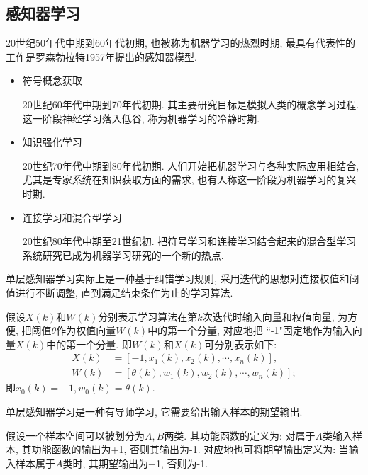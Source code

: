 \subsection{感知器学习}
 20世纪50年代中期到60年代初期, 也被称为机器学习的热烈时期, 最具有代表性的工作是罗森勃拉特1957年提出的感知器模型.
\begin{itemize}
\item 符号概念获取

    20世纪60年代中期到70年代初期. 其主要研究目标是模拟人类的概念学习过程. 这一阶段神经学习落入低谷, 称为机器学习的冷静时期.
\item 知识强化学习

    20世纪70年代中期到80年代初期. 人们开始把机器学习与各种实际应用相结合, 尤其是专家系统在知识获取方面的需求, 也有人称这一阶段为机器学习的复兴时期.
\item 连接学习和混合型学习

    20世纪80年代中期至21世纪初. 把符号学习和连接学习结合起来的混合型学习系统研究已成为机器学习研究的一个新的热点.
\end{itemize}
单层感知器学习实际上是一种基于纠错学习规则, 采用迭代的思想对连接权值和阈值进行不断调整, 直到满足结束条件为止的学习算法.

假设$X (k)$和$W(k)$分别表示学习算法在第$k$次迭代时输入向量和权值向量, 为方便, 把阈值$\theta$作为权值向量$W (k)$中的第一个分量, 对应地把 ``-1"固定地作为输入向量$X (k)$中的第一个分量. 即$W (k)$和$X (k)$可分别表示如下:
\begin{align}
    X (k)&=[-1, x_1 (k), x_2 (k),\cdots, x_n (k)],\\
    W (k)&=[\theta (k),w_1 (k), w_2 (k),\cdots,w_n (k)];
\end{align}
即$x_0 (k)=-1, w_0 (k)=\theta (k)$.

\begin{remark}
    单层感知器学习是一种有导师学习, 它需要给出输入样本的期望输出.
\end{remark}

假设一个样本空间可以被划分为$A, B$两类. 其功能函数的定义为: 对属于$A$类输入样本, 其功能函数的输出为+1, 否则其输出为-1.
对应地也可将期望输出定义为: 当输入样本属于$A$类时, 其期望输出为+1, 否则为-1.


